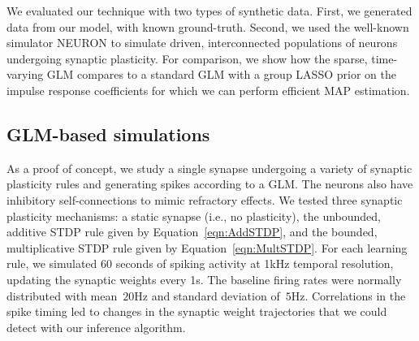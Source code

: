 We evaluated our technique with two types of synthetic data. First, we
generated data from our model, with known ground-truth. Second, we
used the well-known simulator NEURON to simulate driven,
interconnected populations of neurons undergoing synaptic
plasticity. For comparison, we show how the sparse, time-varying GLM
compares to a standard GLM with a group LASSO prior on the impulse
response coefficients for which we can perform efficient MAP
estimation.

\subsection{GLM-based simulations}
As a proof of concept, we study a single synapse undergoing a variety
of synaptic plasticity rules and generating spikes according to a
GLM. The neurons also have inhibitory self-connections to mimic
refractory effects. We tested three synaptic plasticity mechanisms: a
static synapse (i.e., no plasticity), the unbounded, additive STDP
rule given by Equation~\ref{eqn:AddSTDP}, and the bounded,
multiplicative STDP rule given by Equation~\ref{eqn:MultSTDP}. For
each learning rule, we simulated 60 seconds of spiking activity at
1kHz temporal resolution, updating the synaptic weights every 1s. The
baseline firing rates were normally distributed with mean~$20$Hz and
standard deviation of~$5$Hz. Correlations in the spike timing led to
changes in the synaptic weight trajectories that we could detect with
our inference algorithm.

